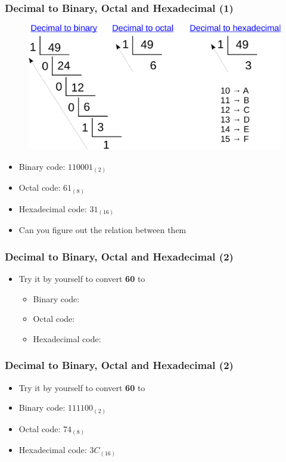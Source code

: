 \begin{frame}
\frametitle{Decimal to Binary, Octal and Hexadecimal (1)}
	\begin{figure}
		\includegraphics[width=0.75\linewidth]{figs/d2b.pdf}
	\end{figure}
	\begin{itemize}
		\item {Binary code: $110001_{(2)}$}
		\item {Octal code: $61_{(8)}$}
		\item {Hexadecimal code: $31_{(16)}$}
		\item {Can you figure out the relation between them}
	\end{itemize}
\end{frame}

\begin{frame}
\frametitle{Decimal to Binary, Octal and Hexadecimal (2)}
	\begin{itemize}
		\item {Try it by yourself to convert \textbf{60} to}
		\begin{itemize}
			\item {Binary code: }
			\item {Octal code: }
			\item {Hexadecimal code: }
		\end{itemize}
	\end{itemize}
\end{frame}

\begin{frame}
\frametitle{Decimal to Binary, Octal and Hexadecimal (2)}
	\begin{itemize}
		\item {Try it by yourself to convert \textbf{60} to}
		\item {Binary code: $111100_{(2)}$}
		\item {Octal code: $74_{(8)}$}
		\item {Hexadecimal code: $3C_{(16)}$}
	\end{itemize}
\end{frame}


